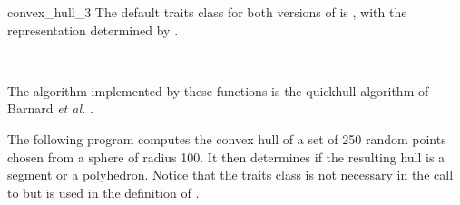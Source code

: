 \begin{ccRefFunction}{convex_hull_3}
The default traits class for both versions of  is 
,%
with the representation determined by .

\ccSeeAlso

  \\

\ccImplementation
The algorithm implemented by these functions is the quickhull algorithm of 
Barnard \textit{et al.} \cite{bdh-qach-96}.  

\ccExample

The following program computes the convex hull of a set of 250 random
points chosen from a sphere of radius 100.  It then determines if the resulting
hull is a segment or a polyhedron.  Notice that the traits class is not
necessary in the call to  but is used in the definition
of .


\end{ccRefFunction}

